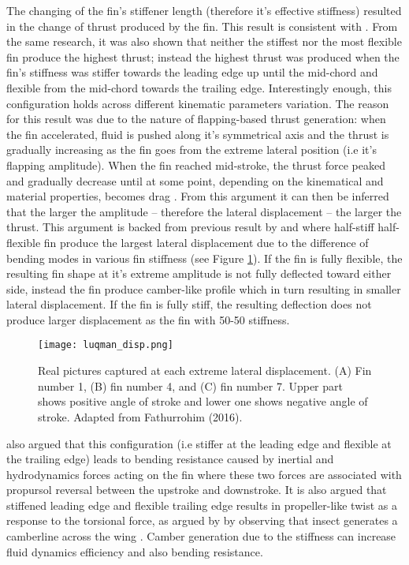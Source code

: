 The changing of the fin's stiffener length (therefore it's effective stiffness) resulted in the change of thrust produced by the fin. This result is consistent with \citet{Esposito56}. From the same research, it was also shown that neither the stiffest nor the most flexible fin produce the highest thrust; instead the highest thrust was produced when the fin's stiffness was stiffer towards the leading edge up until the mid-chord and flexible from the mid-chord towards the trailing edge. Interestingly enough, this configuration holds across different kinematic parameters variation. The reason for this result was due to the nature of flapping-based thrust generation: when the fin accelerated, fluid is pushed along it's symmetrical axis and the thrust is gradually increasing as the fin goes from the extreme lateral position (i.e it's flapping amplitude). When the fin reached mid-stroke, the thrust force peaked and gradually decrease until at some point, depending on the kinematical and material properties, becomes drag \citep{Esposito56,zhushoele,akhtar}. From this argument it can then be inferred that the larger the amplitude -- therefore the lateral displacement -- the larger the thrust. This argument is backed from previous result by \citet{luqman} and \citet{hiroki} where half-stiff half-flexible fin produce the largest lateral displacement due to the difference of bending modes in various fin stiffness (see Figure \ref{fig:luqmandisp}). If the fin is fully flexible, the resulting fin shape at it's extreme amplitude is not fully deflected toward either side, instead the fin produce camber-like profile which in turn resulting in smaller lateral displacement. If the fin is fully stiff, the resulting deflection does not produce larger displacement as the fin with 50-50 stiffness.\par
\begin{figure}[H]
    \centering
    \texttt{[image: luqman\_disp.png]}
    \caption{Real pictures captured at each extreme lateral displacement. (A) Fin number 1, (B) fin number 4, and (C) fin number 7. Upper part shows positive angle of stroke and lower one shows negative angle of stroke. Adapted from Fathurrohim (2016).}
    \label{fig:luqmandisp}
\end{figure}
\citet{aiello} also argued that this configuration (i.e stiffer at the leading edge and flexible at the trailing edge) leads to bending resistance caused by inertial and hydrodynamics forces acting on the fin where these two forces are associated with propursol reversal between the upstroke and downstroke. It is also argued that stiffened leading edge and flexible trailing edge results in propeller-like twist as a response to the torsional force, as argued by \citet{wootton} by observing that insect generates a camberline across the wing \citep{ennos}. Camber generation due to the stiffness can increase fluid dynamics efficiency and also bending resistance.\par
